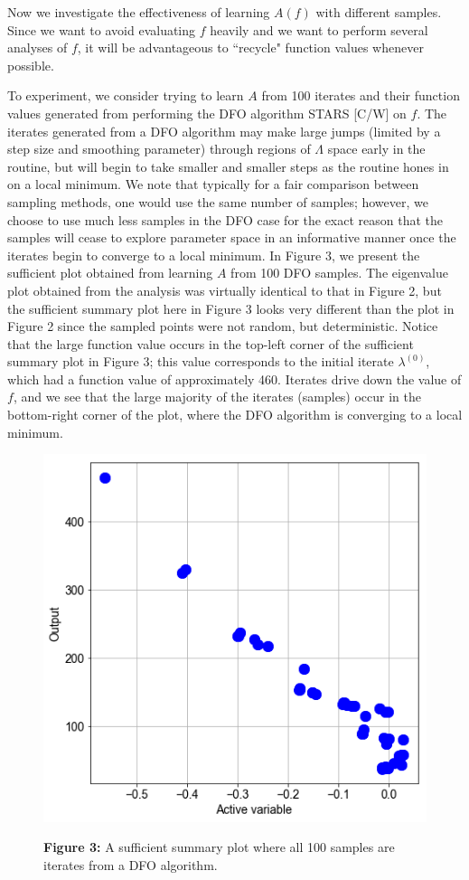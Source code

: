 \documentclass{amsart}
\begin{document}
Now we investigate the effectiveness of learning $A(f)$ with different samples. Since we want to avoid evaluating $f$ heavily and we want to perform several analyses of $f$, it will be advantageous to ``recycle" function values whenever possible. 



To experiment, we consider trying to learn $A$ from 100 iterates and their function values generated from performing the DFO algorithm STARS [C/W] on $f$.  The iterates generated from a DFO algorithm may make large jumps (limited by a step size and smoothing parameter) through regions of $\Lambda$ space early in the routine, but will begin to take smaller and smaller steps as the routine hones in on a local minimum. We note that typically for a fair comparison between sampling methods, one would use the same number of samples; however, we choose to use much less samples in the DFO case for the exact reason that the samples will cease to explore parameter space in an informative manner once the iterates begin to converge to a local minimum. In Figure 3, we present the sufficient plot obtained from learning $A$ from 100 DFO samples. The eigenvalue plot obtained from the analysis was virtually identical to that in Figure 2, but the sufficient summary plot here in Figure 3 looks very different than the plot in Figure 2 since the sampled points were not random, but deterministic. Notice that the large function value occurs in the top-left corner of the sufficient summary plot in Figure 3; this value corresponds to the initial iterate $\lambda^{(0)}$, which had a function value of approximately 460. Iterates drive down the value of $f$, and we see that the large majority of the iterates (samples) occur in the bottom-right corner of the plot, where the DFO algorithm is converging to a local minimum.


\begin{figure} 
\includegraphics[scale=0.3]{suffsum.png}

\textbf{Figure 3:} A sufficient summary plot where all 100 samples are iterates from a DFO algorithm. 
\end{figure} 
\end{document}
